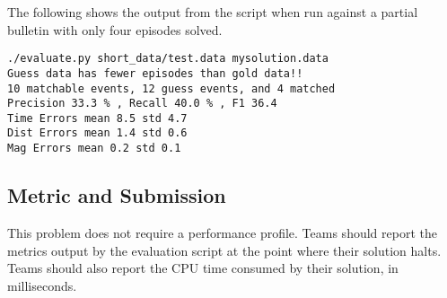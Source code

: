 \documentclass[12pt,letterpaper,onecolumn,oneside]{article}
\begin{document}
The following shows the output from the script when run against a
partial bulletin with only four episodes solved.
\begin{verbatim}
./evaluate.py short_data/test.data mysolution.data
Guess data has fewer episodes than gold data!!
10 matchable events, 12 guess events, and 4 matched
Precision 33.3 % , Recall 40.0 % , F1 36.4
Time Errors mean 8.5 std 4.7
Dist Errors mean 1.4 std 0.6
Mag Errors mean 0.2 std 0.1
\end{verbatim}

\subsection{Metric and Submission}

This problem does not require a performance profile. Teams should report the metrics output by the evaluation script at the point where their solution halts. Teams should also report the CPU time consumed by their solution, in milliseconds.
\end{document}
